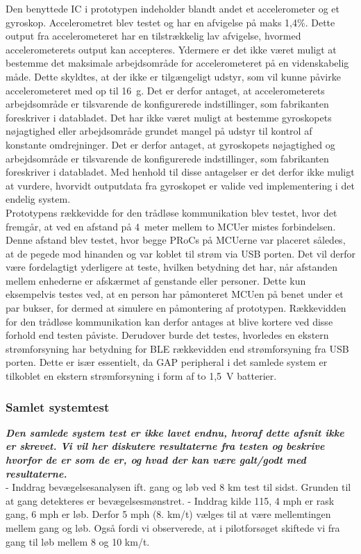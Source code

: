 Den benyttede IC i prototypen indeholder blandt andet et accelerometer og et gyroskop. Accelerometret blev testet og har en afvigelse på maks 1,4\%. Dette output fra accelerometeret har en tilstrækkelig lav afvigelse, hvormed accelerometerets output kan accepteres. Ydermere er det ikke været muligt at bestemme det maksimale arbejdsområde for accelerometeret på en videnskabelig måde. Dette skyldtes, at der ikke er tilgængeligt udstyr, som vil kunne påvirke accelerometeret med op til 16~g. Det er derfor antaget, at accelerometerets arbejdsområde er tilsvarende de konfigurerede indstillinger, som fabrikanten foreskriver i databladet. Det har ikke været muligt at bestemme gyroskopets nøjagtighed eller arbejdsområde grundet mangel på udstyr til kontrol af konstante omdrejninger. Det er derfor antaget, at gyroskopets nøjagtighed og arbejdsområde er tilsvarende de konfigurerede indstillinger, som fabrikanten foreskriver i databladet. Med henhold til disse antagelser er det derfor ikke muligt at vurdere, hvorvidt outputdata fra gyroskopet er valide ved implementering i det endelig system. \\
Prototypens rækkevidde for den trådløse kommunikation blev testet, hvor det fremgår, at ved en afstand på 4~meter mellem to MCUer mistes forbindelsen. Denne afstand blev testet, hvor begge PRoCs på MCUerne var placeret således, at de pegede mod hinanden og var koblet til strøm via USB porten. Det vil derfor være fordelagtigt yderligere at teste, hvilken betydning det har, når afstanden mellem enhederne er afskærmet af genstande eller personer. Dette kun eksempelvis testes ved, at en person har påmonteret MCUen på benet under et par bukser, for dermed at simulere en påmontering af prototypen. Rækkevidden for den trådløse kommunikation kan derfor antages at blive kortere ved disse forhold end testen påviste. Derudover burde det testes, hvorledes en ekstern strømforsyning har betydning for BLE rækkevidden end strømforsyning fra USB porten. Dette er især essentielt, da GAP peripheral i det samlede system er tilkoblet en ekstern strømforsyning i form af to 1,5~V batterier.

\subsubsection{Samlet systemtest}
\textbf{\textit{Den samlede system test er ikke lavet endnu, hvoraf dette afsnit ikke er skrevet. Vi vil her diskutere resultaterne fra testen og beskrive hvorfor de er som de er, og hvad der kan være galt/godt med resultaterne.}} \\
- Inddrag bevægelsesanalysen ift. gang og løb ved 8 km test til sidst. Grunden til at gang detekteres er bevægelsesmønstret.
- Inddrag kilde 115, 4 mph er rask gang, 6 mph er løb. Derfor 5 mph (8. km/t) vælges til at være mellemtingen mellem gang og løb. Også fordi vi observerede, at i pilotforsøget skiftede vi fra gang til løb mellem 8 og 10 km/t.

